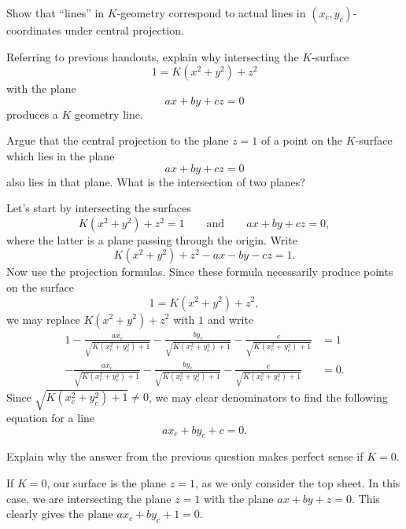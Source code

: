 \documentclass[newpage,hints,handout]{ximera}
\begin{document}
\begin{problem}
  Show that ``lines'' in $K$-geometry correspond to actual lines in
  $(x_{c},y_{c})$-coordinates under central projection.

\begin{hint}
  Referring to previous handouts, explain why intersecting the $K$-surface
  \[
  1 = K(x^2+y^2) + z^2 
  \]
  with the plane
  \[
  ax+by+cz = 0
  \]
  produces a $K$ geometry line.
\end{hint}

\begin{hint}
  Argue that the central projection to the plane $z=1$ of a point on the
  $K$-surface which lies in the plane
  $$ax+by+cz=0$$
  also lies in that plane.  What is the intersection of two planes?
\end{hint}

\begin{freeResponse}
  Let's start by intersecting the surfaces
  \[
  K(x^2+y^2)+z^2=1\qquad\text{and}\qquad ax+by+cz=0,
  \]
  where the latter is a plane passing through the origin. Write
  \[
  K(x^2+y^2)+z^2-ax-by-cz=1.
  \]
  Now use the projection formulas. Since these formula necessarily
  produce points on the surface
  \[
  1 = K\left(x^2+y^2\right) + z^2,
  \]
  we may replace $K\left(x^2+y^2\right) + z^2$ with $1$ and write
  \begin{align*}
    1-\frac{ax_c}{\sqrt{K\left(x_c^2 + y_c^2\right)+1}}- \frac{by_c}{\sqrt{K\left(x_c^2 + y_c^2\right)+1}}-\frac{c}{\sqrt{K\left(x_c^2 + y_c^2\right)+1}} &=1\\
    -\frac{ax_c}{\sqrt{K\left(x_c^2 + y_c^2\right)+1}}- \frac{by_c}{\sqrt{K\left(x_c^2 + y_c^2\right)+1}}-\frac{c}{\sqrt{K\left(x_c^2 + y_c^2\right)+1}} &=0.
  \end{align*}
  Since $\sqrt{K\left(x_c^2 + y_c^2\right)+1} \ne 0$, we may clear
  denominators to find the following equation for a line
  \[
  ax_c+by_c+c= 0.
  \]
\end{freeResponse}
\end{problem}

\begin{problem}
  Explain why the answer from the previous question makes perfect sense if $K=0$.
  \begin{freeResponse}
    If $K=0$, our surface is the plane $z=1$, as we only consider the
    top sheet. In this case, we are intersecting the plane $z=1$ with
    the plane $ax+by+z=0$. This clearly gives the plane $ax_c+ by_c +
    1 = 0.$
  \end{freeResponse}
\end{problem}
\end{document}

